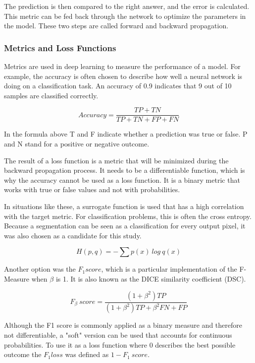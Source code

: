 The prediction is then compared to the right answer, and the error is calculated. This metric can be fed back through the network to optimize the parameters in the model. These two steps are called forward and backward propagation.

\subsubsection{Metrics and Loss Functions}

Metrics are used in deep learning to measure the performance of a model. For example, the accuracy is often chosen to describe how well a neural network is doing on a classification task. An accuracy of 0.9 indicates that 9 out of 10 samples are classified correctly.

\begin{equation}
Accuracy = \frac{TP+TN}{TP+TN+FP+FN}
\end{equation}

In the formula above T and F indicate whether a prediction was true or false. P and N stand for a positive or negative outcome.

The result of a loss function is a metric that will be minimized during the backward propagation process. It needs to be a differentiable function, which is why the accuracy cannot be used as a loss function. It is a binary metric that works with true or false values and not with probabilities.

In situations like these, a surrogate function is used that has a high correlation with the target metric. For classification problems, this is often the cross entropy. Because a segmentation can be seen as a classification for every output pixel, it was also chosen as a candidate for this study.

\begin{equation}
H(p, q) = -\sum p(x) \ log \ q(x)
\end{equation}

Another option was the $F_1 score$, which is a particular implementation of the F-Measure when $ \beta $ is 1. It is also known as the DICE similarity coefficient (DSC).

\begin{equation}
F_\beta \ score= \frac{(1 + \beta^2) TP}{(1+\beta^2)TP+\beta^2FN+FP}
\end{equation}

Although the F1 score is commonly applied as a binary measure and therefore not differentiable, a "soft" version can be used that accounts for continuous probabilities. To use it as a loss function where 0 describes the best possible outcome the $F_1 loss$ was defined as $ 1 - F_1 \ score $.

